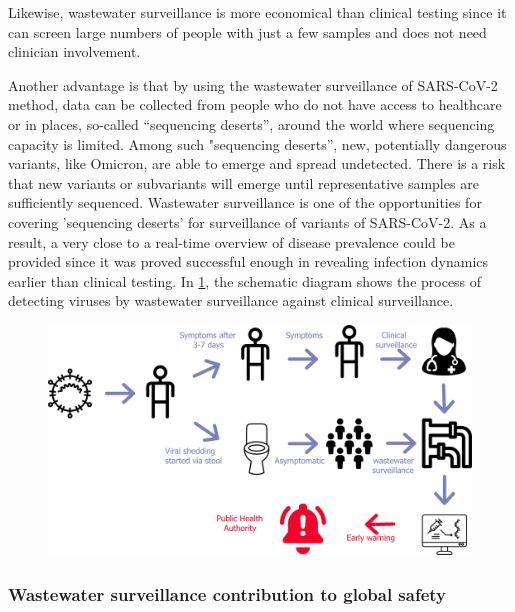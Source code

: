         Likewise, wastewater surveillance is more economical than clinical testing since it can screen large numbers of people with just a few samples and does not need clinician involvement.
        
        Another advantage is that by using the wastewater surveillance of SARS-CoV-2 method, data can be collected from people who do not have access to healthcare or in places, so-called “sequencing deserts”, around the world where sequencing capacity is limited. Among such "sequencing deserts'', new, potentially dangerous variants, like Omicron, are able to emerge and spread undetected. There is a risk that new variants or subvariants will emerge until representative samples are sufficiently sequenced. Wastewater surveillance is one of the opportunities for covering 'sequencing deserts' for surveillance of variants of SARS-CoV-2. As a result, a very close to a real-time overview of disease prevalence could be provided since it was proved \cite{zhang2021} successful enough in revealing infection dynamics earlier than clinical testing. In \cref{fig:intro:ww-process}, the schematic diagram shows the process of detecting viruses by wastewater surveillance against clinical surveillance. 
        \begin{figure}[h]
        	\centering
            \includegraphics[width=1\textwidth]{figures/intro/ww-process-v2.png}
            \label{fig:intro:ww-process}
        \end{figure}

        \subsubsection{Wastewater surveillance contribution to global safety} 
        
